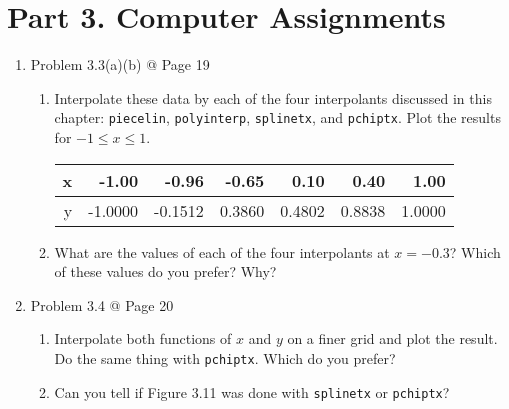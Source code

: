 \documentclass[10pt]{report}
\begin{document}
\section*{Part 3. Computer Assignments}
\begin{enumerate}
	\item 
	Problem 3.3(a)(b) @ Page 19
	\begin{enumerate}
		\item
		Interpolate these data by each of the four interpolants discussed in this
		chapter: \verb|piecelin|, \verb|polyinterp|, \verb|splinetx|, and \verb|pchiptx|. Plot the results for $-1 \le x \le 1$.
		\begin{table}[H]
			\centering
			\begin{tabular}{*{7}{N}} \toprule
				x & -1.00 & -0.96 & -0.65 & 0.10 & 0.40 & 1.00\\ \midrule
				y & -1.0000 & -0.1512 & 0.3860 & 0.4802 & 0.8838 & 1.0000\\
				\bottomrule
			\end{tabular}
		\end{table}
		
		\item 
		What are the values of each of the four interpolants at $x = -0.3$? Which
		of these values do you prefer? Why?
	\end{enumerate}
	
	\item 
	Problem 3.4 @ Page 20
	\begin{enumerate}
		\item 
		Interpolate both functions of $x$ and $y$ on a finer grid and plot the result. Do the same thing with \verb|pchiptx|. Which do you prefer?
		
		\item 
		Can you tell if Figure 3.11 was done with \verb|splinetx| or \verb|pchiptx|?
	\end{enumerate}
\end{enumerate}
\end{document}
